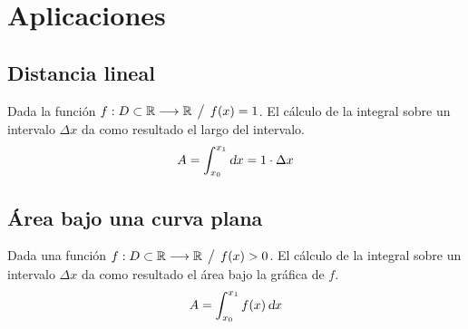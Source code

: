 

\section{Aplicaciones}


\subsection{Distancia lineal}

Dada la función $f:D \subset \mathbb{R} \longrightarrow \mathbb{R} \hspace{1ex} \big/ \hspace{1ex} f(x)=1$.
El cálculo de la integral sobre un intervalo $\Delta x$ da como resultado el largo del intervalo.
\begin{equation*}
    A = \int_{x_0}^{x_1} \textsl{d} x = 1 \cdot \Delta x
\end{equation*}

\begin{center}
    \def\svgwidth{0.6\linewidth}
    
\end{center}


\subsection{Área bajo una curva plana}

Dada una función $f:D \subset \mathbb{R} \longrightarrow \mathbb{R} \hspace{1ex} \big/ \hspace{1ex} f(x)>0$.
El cálculo de la integral sobre un intervalo $\Delta x$ da como resultado el área bajo la gráfica de $f$.
\begin{equation*}
    A = \int_{x_0}^{x_1} f(x) \, \textsl{d} x
\end{equation*}


